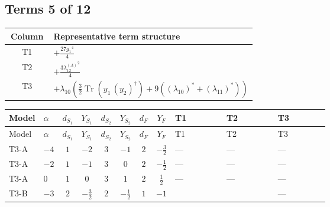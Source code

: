 \documentclass[8pt]{article}
\begin{document}
\begin{landscape}
\subsection*{Terms 5 of 12}
\begin{center}
\begin{tabular}{@{}c >{\raggedright\arraybackslash}p{0.82\linewidth}@{}}
\toprule
Column & Representative term structure \\
\midrule
T1 & \(\displaystyle +\frac{27 {g_1}^4}{4}\) \\
\midrule
T2 & \(\displaystyle +\frac{3 {\lambda_{12}^{(A)}}^2}{4}\) \\
\midrule
T3 & \(\displaystyle +{\lambda_{10}} \left(\frac{3}{2} \operatorname{Tr}\!\left({y_1}\,\left({y_2}\right)^{\dagger}\right)+9 (\left({\lambda_{10}}\right)^{*}+\left({\lambda_{11}}\right)^{*})\right)\) \\
\midrule
\bottomrule
\end{tabular}
\end{center}
\smallskip
\tiny
\begin{longtable}{@{}llcccccc >{\raggedright\arraybackslash}p{0.21\linewidth} >{\raggedright\arraybackslash}p{0.21\linewidth} >{\raggedright\arraybackslash}p{0.21\linewidth}@{}}
\toprule
Model & $\alpha$ & $d_{S_1}$ & $Y_{S_1}$ & $d_{S_2}$ & $Y_{S_2}$ & $d_F$ & $Y_F$ & T1 & T2 & T3 \\
\midrule
\endfirsthead
\toprule
Model & $\alpha$ & $d_{S_1}$ & $Y_{S_1}$ & $d_{S_2}$ & $Y_{S_2}$ & $d_F$ & $Y_F$ & T1 & T2 & T3 \\
\midrule
\endhead
T3-A & $-4$ & $1$ & $-2$ & $3$ & $-1$ & $2$ & $-\frac{3}{2}$ & --- & --- & --- \\
\midrule
T3-A & $-2$ & $1$ & $-1$ & $3$ & $0$ & $2$ & $-\frac{1}{2}$ & --- & --- & --- \\
\midrule
T3-A & $0$ & $1$ & $0$ & $3$ & $1$ & $2$ & $\frac{1}{2}$ & --- & --- & --- \\
\midrule
T3-B & $-3$ & $2$ & $-\frac{3}{2}$ & $2$ & $-\frac{1}{2}$ & $1$ & $-1$ & \scriptsize\adjustbox{max width=\linewidth}{$\begin{gathered} +\frac{27 {g_1}^4}{4}\end{gathered}$} & \scriptsize\adjustbox{max width=\linewidth}{$\begin{gathered} +\frac{3 {\lambda_{12}^{(A)}}^2}{4}\end{gathered}$} & --- \\
\midrule

\end{longtable}
\end{landscape}
\end{document}
